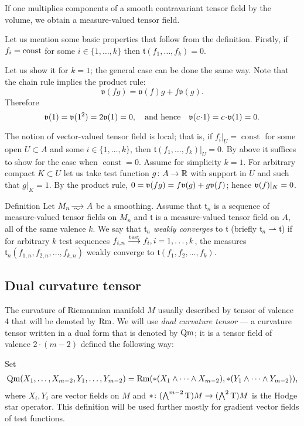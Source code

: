 If one multiplies components of a smooth contravariant tensor field by the volume, we obtain a measure-valued tensor field.

Let us mention some basic properties that follow 
from the definition.
Firstly, if $f_i=\mathrm{const}$  for some $i\in\{1,\dots,k\}$ 
then $\mathfrak{t}(f_1,\dots,f_k)=0.$

Let us show it for $k=1$; the general case can be done the same way.
Note that the chain rule implies the
product rule:
\[\mathfrak{v}(fg)=\mathfrak{v}(f)g+f\mathfrak{v}(g).\]
Therefore 
\[\vv(1)=\vv(1^2)=2\vv(1)=0,
\quad\text{and hence}\quad
\vv(c\cdot 1)=c\cdot\vv(1)=0.
\]

The notion of vector-valued tensor field is local;
that is, if $f_i|_{U}=\operatorname{const}$
for some open $U\subset A$ and some $i\in\{1,\dots,k\}$,
 then $\mathfrak{t}(f_1,\dots,f_k)|_U=0.$
By above it suffices to show
for the case when $\operatorname{const}=0$.
Assume for simplicity  $k=1$. 
For arbitrary compact $K\subset U$ let
us take test function $g\colon A\to\mathbb{R}$ with support in
$U$ and such that $g|_K=1$.
By the product rule,
 $0=\mathfrak{v}(fg)=f\mathfrak{v}(g)+g\mathfrak{v}(f)$;
 hence 
$\mathfrak{v}(f)|_K=0$.

\begin{rdef} {Definition}
Let $M_n\smooths{} A$ be a smoothing.
Assume that $\mathfrak{t}_n$ is a sequence of %
 measure-valued tensor fields on $M_n$  and $\mathfrak{t}$ is a
measure-valued tensor field on $A$,
all of the same valence $k$.
We say that $\mathfrak{t}_n$ \emph{weakly converges} to  $\mathfrak{t}$
(briefly $\mathfrak{t}_n\rightharpoonup\mathfrak{t}$) if for arbitrary $k$
test sequences 
$f_{i,n}\stackrel{\tiny\rm test}{\longrightarrow} f_i, i=1,\dots,k$, the measures $\mathfrak{t}_n(f_{1,n},f_{2,n},\dots,f_{k,n})$ weakly converge to $\mathfrak{t}(f_{1},f_{2},\dots,f_{k})$.
\end{rdef}

\subsection{Dual curvature tensor}

The curvature of Riemannian manifold $M$ usually described by tensor of valence 4 that will be denoted by $\operatorname{\rm Rm}$.
We will use \emph{dual curvature tensor} --- 
a curvature tensor written in a dual form that is denoted by $\operatorname{\rm Qm}$;
it is a tensor field of valence $2\cdot(m-2)$ defined the following way:

Set
\begin{multline*}
\operatorname{\rm Qm}(X_1,\dots,X_{m-2},Y_1,\dots,Y_{m-2})
= 
\operatorname{\rm Rm}(*(X_1\wedge\dots\wedge X_{m-2}), *(Y_1\wedge\dots\wedge Y_{m-2})),
\end{multline*}
where $X_i,Y_i$ are vector fields on $M$ and  ${*}\colon(\bigwedge^{m-2}\mathrm{T})M\to(\bigwedge^2\mathrm{T})M$ is the  Hodge star operator.
This definition will be used further mostly for gradient vector fields of test functions.

